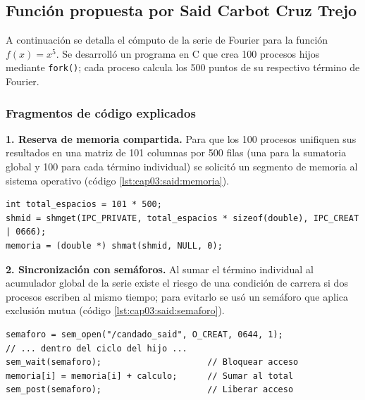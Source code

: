 
\subsection{Función propuesta por Said Carbot Cruz Trejo}
\label{sec:cap03:said}

A continuación se detalla el cómputo de la serie de Fourier para la función $f(x) = x^{5}$. Se desarrolló un programa en C que crea 100 procesos hijos mediante \texttt{fork()}; cada proceso calcula los 500 puntos de su respectivo término de Fourier.

\subsubsection{Fragmentos de código explicados}
\label{sec:cap03:said:codigo}

\textbf{1. Reserva de memoria compartida.} Para que los 100 procesos unifiquen sus resultados en una matriz de 101 columnas por 500 filas (una para la sumatoria global y 100 para cada término individual) se solicitó un segmento de memoria al sistema operativo (código \ref{lst:cap03:said:memoria}).

\begin{lstlisting}[style=C, caption={Reserva y acoplamiento del segmento de memoria compartida.}, label={lst:cap03:said:memoria}]
int total_espacios = 101 * 500;
shmid = shmget(IPC_PRIVATE, total_espacios * sizeof(double), IPC_CREAT | 0666);
memoria = (double *) shmat(shmid, NULL, 0);
\end{lstlisting}

\textbf{2. Sincronización con semáforos.} Al sumar el término individual al acumulador global de la serie existe el riesgo de una condición de carrera si dos procesos escriben al mismo tiempo; para evitarlo se usó un semáforo que aplica exclusión mutua (código \ref{lst:cap03:said:semaforo}).

\begin{lstlisting}[style=C, caption={Semáforo POSIX con nombre y sección crítica de la acumulación.}, label={lst:cap03:said:semaforo}]
semaforo = sem_open("/candado_said", O_CREAT, 0644, 1);
// ... dentro del ciclo del hijo ...
sem_wait(semaforo);                     // Bloquear acceso
memoria[i] = memoria[i] + calculo;      // Sumar al total
sem_post(semaforo);                     // Liberar acceso
\end{lstlisting}

